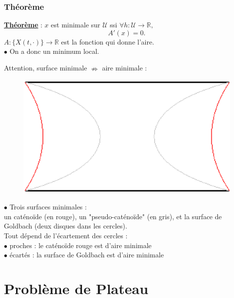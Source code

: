 \documentclass{beamer}
\newcommand{\gs}[1]{\textbf{\underline{#1}}}
\newcommand{\R}{\mathbb{R}}
\begin{document}
\begin{frame}
\frametitle{Théorème}
\gs{Théorème} : $x$ est minimale sur $\mathscr{U}$ ssi $\forall h:\mathscr{U} \rightarrow \R,$ $$ A'(x)=0.$$
$A:\{X(t, \cdot)\}\rightarrow \R$ est la fonction qui donne l'aire.\\
\pause
\vspace{1cm}
$\bullet$ On a donc un minimum local.\\
\end{frame}

\begin{frame}
Attention, surface minimale $\nRightarrow$ aire minimale : \\
\begin{figure}[h!]
      \centering 
      \includegraphics[scale=0.37]{3a.eps}
\end{figure}
$\bullet$ Trois surfaces minimales : \\un caténoïde (en rouge), un "pseudo-caténoïde" (en gris), et la surface de Goldbach (deux disques dans les cercles).\\
\pause
Tout dépend de l'écartement des cercles : \\
$\bullet$ proches : le caténoïde rouge est d'aire minimale\\
$\bullet$ écartés : la surface de Goldbach est d'aire minimale\\
\end{frame}

\section{Problème de Plateau}
\end{document}
